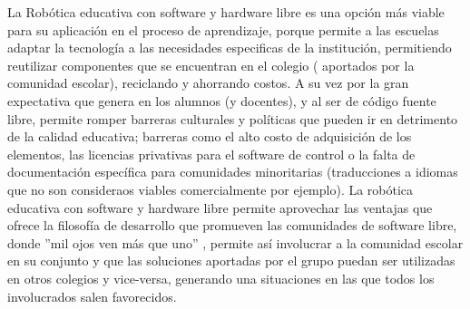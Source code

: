 La Robótica educativa con software y hardware libre es una opción más viable para su aplicación en el proceso de aprendizaje, 
porque permite a las escuelas adaptar la tecnología a las necesidades especificas de la institución, permitiendo reutilizar componentes que se encuentran en el colegio ( aportados por la comunidad escolar), reciclando y  ahorrando costos. A su vez por la gran expectativa que genera en los alumnos (y docentes), y al ser de código fuente libre, permite romper barreras culturales y políticas que pueden ir en detrimento de la calidad educativa; barreras como el alto costo de adquisición de los elementos, las licencias privativas para el software de control o la falta de documentación específica para comunidades minoritarias (traducciones a idiomas que no son consideraos viables comercialmente por ejemplo). La robótica educativa con software y hardware libre permite aprovechar las ventajas que ofrece la filosofía de desarrollo que promueven las comunidades de software libre, donde ''mil ojos ven más que uno'' \citep{raymond_catedral_1998}, permite así involucrar a la comunidad escolar en su conjunto y que las soluciones aportadas por el grupo puedan ser utilizadas en otros colegios y vice-versa, generando una situaciones en las que todos los involucrados salen favorecidos.
